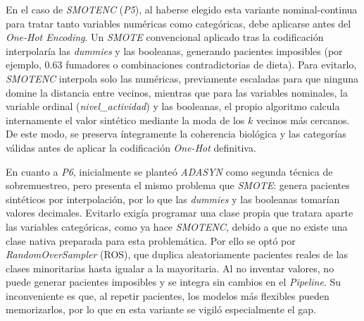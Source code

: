 \documentclass[journal,onecolumn]{IEEEtran}
\begin{document}
En el caso de \textit{SMOTENC} (\textit{P5}), al haberse elegido esta variante nominal-continua para tratar tanto variables numéricas como categóricas, debe aplicarse antes del \textit{One-Hot Encoding}. Un \textit{SMOTE} convencional aplicado tras la codificación interpolaría las \textit{dummies} y las booleanas, generando pacientes imposibles (por ejemplo, 0.63 fumadores o combinaciones contradictorias de dieta). Para evitarlo, \textit{SMOTENC} interpola solo las numéricas, previamente escaladas para que ninguna domine la distancia entre vecinos, mientras que para las variables nominales, la variable ordinal (\textit{nivel\_actividad}) y las booleanas, el propio algoritmo calcula internamente el valor sintético mediante la moda de los $k$ vecinos más cercanos. De este modo, se preserva íntegramente la coherencia biológica y las categorías válidas antes de aplicar la codificación \textit{One-Hot} definitiva.

En cuanto a \textit{P6}, inicialmente se planteó \textit{ADASYN} como segunda técnica de sobremuestreo, pero presenta el mismo problema que \textit{SMOTE}: genera pacientes sintéticos por interpolación, por lo que las \textit{dummies} y las booleanas tomarían valores decimales. Evitarlo exigía programar una clase propia que tratara aparte las variables categóricas, como ya hace \textit{SMOTENC}, debido a que no existe una clase nativa preparada para esta problemática. Por ello se optó por \textit{RandomOverSampler} (ROS), que duplica aleatoriamente pacientes reales de las clases minoritarias hasta igualar a la mayoritaria. Al no inventar valores, no puede generar pacientes imposibles y se integra sin cambios en el \textit{Pipeline}. Su inconveniente es que, al repetir pacientes, los modelos más flexibles pueden memorizarlos, por lo que en esta variante se vigiló especialmente el gap.
\end{document}
